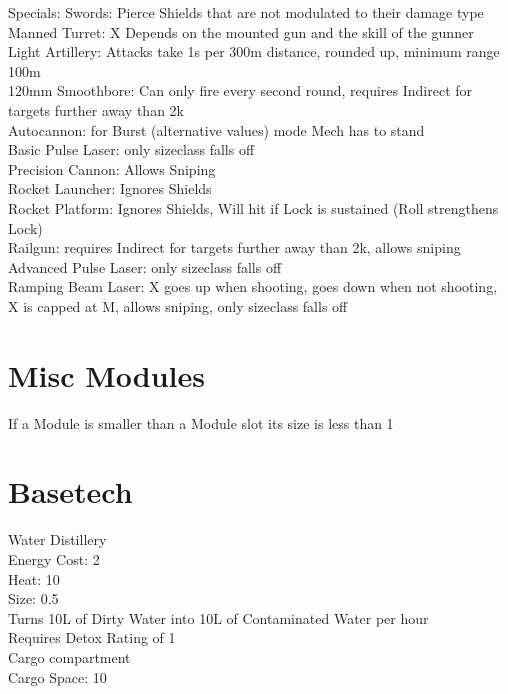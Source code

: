 Specials:
Swords: Pierce Shields that are not modulated to their damage type\\
Manned Turret: X Depends on the mounted gun and the skill of the gunner\\
Light Artillery: Attacks take 1s per 300m distance, rounded up, minimum range 100m\\
120mm Smoothbore: Can only fire every second round, requires Indirect for targets further away than 2k\\
Autocannon: for Burst (alternative values) mode Mech has to stand\\
Basic Pulse Laser: only sizeclass falls off\\
Precision Cannon: Allows Sniping \\
Rocket Launcher: Ignores Shields \\
Rocket Platform: Ignores Shields, Will hit if Lock is sustained (Roll strengthens Lock)\\
Railgun: requires Indirect for targets further away than 2k, allows sniping\\
Advanced Pulse Laser: only sizeclass falls off\\
Ramping Beam Laser: X goes up when shooting, goes down when not shooting, X is capped at M, allows sniping,
        only sizeclass falls off\\
\section{Misc Modules}\label{sec:miscmodules}
If a Module is smaller than a Module slot its size is less than 1
\newline
\section{Basetech}\label{sec:basetech}
Water Distillery \\
Energy Cost: 2\\
Heat: 10\\
Size: 0.5\\
Turns 10L of Dirty Water into 10L of Contaminated Water per hour\\
Requires Detox Rating of 1\\
\newline
Cargo compartment\\
Cargo Space: 10 \\
\newline
